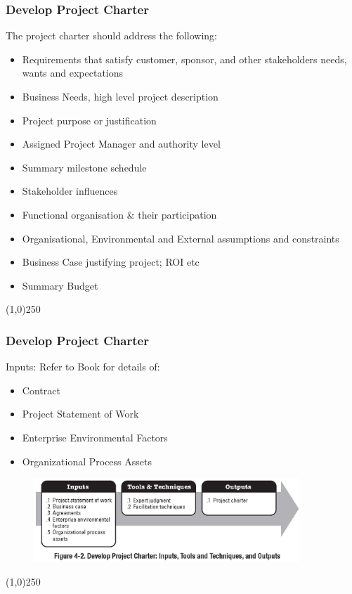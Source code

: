 \begin{frame}
\frametitle{Develop Project Charter}
The project charter should address the following:
\begin{itemize}
	\item Requirements that satisfy customer, sponsor, and other stakeholders needs, wants and expectations
	\item Business Needs, high level project description
	\item Project purpose or justification
	\item Assigned Project Manager and authority level
	\item Summary milestone schedule
	\item Stakeholder influences
	\item Functional organisation \& their participation
	\item Organisational, Environmental and External assumptions and constraints
	\item Business Case justifying project; ROI etc
	\item Summary Budget
\end{itemize}
\end{frame}\begin{center}\line(1,0){250}\end{center}
%
%


\begin{frame}
\frametitle{Develop Project Charter} 
Inputs: Refer to Book for details of:
\begin{itemize}
	\item Contract
	\item Project Statement of Work
	\item Enterprise Environmental Factors
	\item Organizational Process Assets
\end{itemize}
\begin{figure}
	\centering
 		\includegraphics[width = 10cm]{images/Fig4-2.jpg}
 	\label{fig:4-2}
 \end{figure}
\end{frame}\begin{center}\line(1,0){250}\end{center}
%
%


